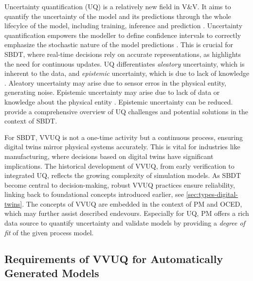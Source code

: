Uncertainty quantification (UQ) is a relatively new field in V&V. It aims to quantify the uncertainty of the model and its predictions through the whole lifecylce of the model, including training, inference and prediction \autocite{sel2025survey}. Uncertainty quantification empowers the modeller to define confidence intervals to correctly emphasize the stochastic nature of the model predictions \autocite{volodina2021importance}. This is crucial for SBDT, where real-time decisions rely on accurate representations, as \autocite{francis2021towards} highlights the need for continuous updates. UQ differentiates \textit{aleatory} uncertainty, which is inherent to the data, and \textit{epistemic} uncertainty, which is due to lack of knowledge \autocite{sel2025survey}. Aleatory uncertainty may arise due to sensor erros in the physical entity, generating noise. Epistemic uncertainty may arise due to lack of data or knowledge about the physical entity \autocite{thelen2023comprehensive}. Epistemic uncertainty can be reduced. \Autocite{abdoune2022handling} provide a comprehensive overview of UQ challenges and potential solutions in the context of SBDT.

For SBDT, VVUQ is not a one-time activity but a continuous process, ensuring digital twins mirror physical systems accurately. This is vital for industries like manufacturing, where decisions based on digital twins have significant implications.
The historical development of VVUQ, from early verification to integrated UQ, reflects the growing complexity of simulation models. As SBDT become central to decision-making, robust VVUQ practices ensure reliability, linking back to foundational concepts introduced earlier, see \autoref{sec:types-digital-twins}. The concepts of VVUQ are embedded in the context of PM and OCED, which may further assist described endevours. Especially for UQ, PM offers a rich data source to quantify uncertainty and validate models by providing a \textit{degree of fit} of the given process model.



\subsection{Requirements of VVUQ for Automatically Generated Models}
\label{sec:requirements-automatically-generated-models}

